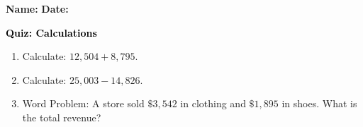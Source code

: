 \documentclass[12pt, letterpaper, fleqn]{article}
\begin{document}
\textbf{Name:} \underline{\hspace{5cm}}
\hfill
\textbf{Date:} \underline{\hspace{3cm}}\\

\begin{tcolorbox}[colback=customteal!20]
    \large\textcolor{black}{\textbf{Quiz: Calculations}}
\end{tcolorbox}
\begin{enumerate}[itemsep=3.5cm, leftmargin=0.6cm]
\item Calculate: $12,504 + 8,795$.
\vspace{3cm}
\item Calculate: $25,003 - 14,826$.
\vspace{3cm}
\item Word Problem: A store sold $\$3,542$ in clothing and $\$1,895$ in shoes. What is the total revenue?
\end{enumerate}
\end{document}
